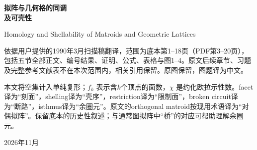 \documentclass[UTF8,11pt,a4paper,fontset=windows]{ctexart}
\begin{document}
\begin{titlepage}\centering\vspace*{25mm}
{\Huge\bfseries 拟阵与几何格的同调\\[4mm]及可壳性\par}\vspace{10mm}
{\large Homology and Shellability of Matroids and Geometric Lattices\par}
\vspace{15mm}{\Large Anders Björner\par}
\vspace{15mm}{\LARGE 第7.1--7.5节中文译本\par}\vfill
\begin{minipage}{.9\textwidth}\small
依据用户提供的1990年3月扫描稿翻译，范围为底本第1--18页（PDF第3--20页），包括五节全部正文、编号结果、证明、公式、表格与图1--4。原文后续章节、习题及完整参考文献表不在本次范围内，相关引用保留。原图保留，图题译为中文。

本文将空集计入单纯复形；$f_k$ 表示含$k$个顶点的面数，$\chi$ 是约化欧拉示性数。facet译为“刻面”，shelling译为“壳序”，restriction译为“限制面”，broken circuit译为“断路”，isthmus译为“余圈元”。原文的orthogonal matroid按现用术语译为“对偶拟阵”。保留底本的历史性叙述；与通常图拟阵中“桥”的对应可帮助理解余圈元。
\end{minipage}\vspace{10mm}\par 2026年11月
\end{titlepage}
\tableofcontents\clearpage





\end{document}
